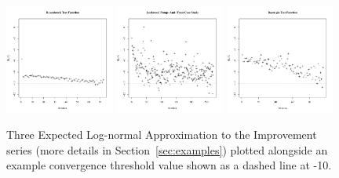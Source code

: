 \documentclass[12pt]{article}
\begin{document}
%
%
\begin{figure}[htb]
\includegraphics[width=0.32\textwidth]{./figures/introChartRoseEasyEasyAxis.pdf}
\includegraphics[width=0.32\textwidth]{./figures/introChartLock6Three20000Axis.pdf}
\includegraphics[width=0.32\textwidth]{./figures/introChartRastHardAxis.pdf}
\caption{
%
Three Expected Log-normal Approximation to the Improvement series (more details in Section~\ref{sec:examples}) plotted alongside an example convergence threshold value shown as a dashed line at -10.
}
\label{introFig}
\end{figure}
%
%

\end{document}

